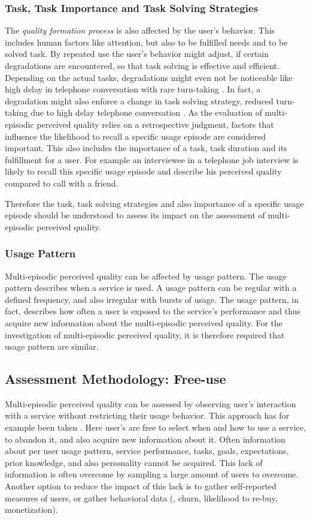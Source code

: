 \subsubsection*{Task, Task Importance and Task Solving Strategies}
The \emph{quality formation process} is also affected by the user's behavior.
This includes human factors like attention, but also to be fulfilled needs and to be solved task.
By repeated use the user's behavior might adjust, if certain degradations are encountered, so that task solving is effective and efficient.
Depending on the actual tasks, degradations might even not be noticeable like high delay in telephone conversation with rare turn-taking \citep[\cf][]{schoenenberg_quality_????}. %
In fact, a degradation might also enforce a change in task solving strategy, \eg reduced turn-taking due to high delay telephone conversation \citep[\cf][]{schoenenberg_quality_????}.
As the evaluation of multi-episodic perceived quality relies on a retrospective judgment, factors that influence the likelihood to recall a specific usage episode are considered important.
This also includes the importance of a task, task duration and its fulfillment for a user.
For example an interviewee in a telephone job interview is likely to recall this specific usage episode and describe his perceived quality compared to call with a friend.

Therefore the task, task solving strategies and also importance of a specific usage episode should be understood to assess its impact on the assessment of multi-episodic perceived quality.

\subsubsection*{Usage Pattern}
Multi-episodic perceived quality can be affected by usage pattern.
The usage pattern describes when a service is used.
A usage pattern can be regular with a defined frequency, and also irregular with bursts of usage.
The usage pattern, in fact, describes how often a user is exposed to the service's performance and thus acquire new information about the multi-episodic perceived quality.
For the investigation of multi-episodic perceived quality, it is therefore required that usage pattern are similar.

\subsection{Assessment Methodology: Free-use}
Multi-episodic perceived quality can be assessed by observing user's interaction with a service without restricting their usage behavior.
This approach has for example been taken \cite{duncanson_average_1969}.
Here user's are free to select when and how to use a service, to abandon it, and also acquire new information about it. %
Often information about per user usage pattern, service performance, tasks, goals, expectations, prior knowledge, and also personality cannot be acquired.
This lack of information is often overcome by sampling a large amount of users to overcome.
Another option to reduce the impact of this lack is to gather self-reported measures of users, or gather behavioral data (\eg, churn, likelihood to re-buy, monetization).

